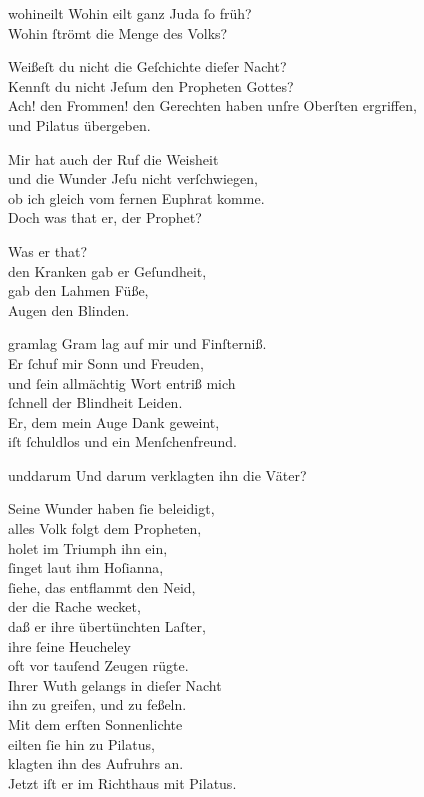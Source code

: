 \documentclass[abbrwidth=6em,tocstyle=ref-genre,toe=false]{ees}
\begin{document}
{\begin{movement}{wohineilt}
  \voice[Fremdling]
  Wohin eilt ganz Juda ſo früh?\\
  Wohin ſtrömt die Menge des Volks?

  \voice[Blindgebohrner]
  Weißeſt du nicht die Geſchichte dieſer Nacht?\\
  Kennſt du nicht Jeſum den Propheten Gottes?\\
  Ach! den Frommen! den Gerechten haben unſre Oberſten ergriffen,\\
  und Pilatus übergeben.

  \voice[Fremdling]
  Mir hat auch der Ruf die Weisheit\\
  und die Wunder Jeſu nicht verſchwiegen,\\
  ob ich gleich vom fernen Euphrat komme.\\
  Doch was that er, der Prophet?

  \voice[Blindgebohrner]
  Was er that?\\
  den Kranken gab er Geſundheit,\\
  gab den Lahmen Füße,\\
  Augen den Blinden.
\end{movement}

\begin{movement}{gramlag}
  \voice[Blindgebohrner]
  Gram lag auf mir und Finſterniß.\\
  Er ſchuf mir Sonn und Freuden,\\
  und ſein allmächtig Wort entriß mich\\
  ſchnell der Blindheit Leiden.\\
  Er, dem mein Auge Dank geweint,\\
  iſt ſchuldlos und ein Menſchenfreund.
\end{movement}

\begin{movement}{unddarum}
  \voice[Fremdling]
  Und darum verklagten ihn die Väter?

  \voice[Blindgebohrner]
  Seine Wunder haben ſie beleidigt,\\
  alles Volk folgt dem Propheten,\\
  holet im Triumph ihn ein,\\
  ſinget laut ihm Hoſianna,\\
  ſiehe, das entflammt den Neid,\\
  der die Rache wecket,\\
  daß er ihre übertünchten Laſter,\\
  ihre ſeine Heucheley\\
  oft vor tauſend Zeugen rügte.\\
  Ihrer Wuth gelangs in dieſer Nacht\\
  ihn zu greifen, und zu feßeln.\\
  Mit dem erſten Sonnenlichte\\
  eilten ſie hin zu Pilatus,\\
  klagten ihn des Aufruhrs an.\\
  Jetzt iſt er im Richthaus mit Pilatus.


\end{movement}}
\end{document}
